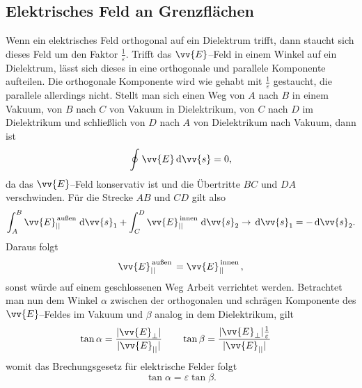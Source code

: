 \subsection{Elektrisches Feld an Grenzflächen}
Wenn ein elektrisches Feld orthogonal auf ein Dielektrum trifft, dann staucht sich dieses Feld um den Faktor $\tfrac{1}{\varepsilon }$. Trifft das $\vv{E}$--Feld in einem Winkel auf ein Dielektrum, lässt sich dieses in eine orthogonale und parallele Komponente aufteilen. Die orthogonale Komponente wird wie gehabt mit $\tfrac{1}{\varepsilon }$ gestaucht, die parallele allerdings nicht. Stellt man sich einen Weg von $A$ nach $B$ in einem Vakuum, von $B$ nach $C$ von Vakuum in Dielektrikum, von $C$ nach $D$ im Dielektrikum und schließlich von $D$ nach $A$ von Dielektrikum nach Vakuum, dann ist
\[ 
        \oint_{}^{}\vv{E}\td \vv{s}=0
,\] 
da das $\vv{E}$--Feld konservativ ist und die Übertritte $BC$ und $DA$ verschwinden. Für die Strecke $AB$ und $CD$ gilt also
\begin{align*}
        \int_{A}^{B}\vv{E}_{| |}^{\,\text{außen}\,}\td \vv{s}_1+\int_{C}^{D}\vv{E}_{| |}^{\,\text{innen}\,}\td \vv{s}_2\rightarrow \td \vv{s}_1=-\td \vv{s}_2
.\end{align*}
Daraus folgt
\[ 
        \vv{E}_{| |}^{\,\text{außen}\,}=\vv{E}_{| |}^{\,\text{innen}\,}
,\] 
sonst würde auf einem geschlossenen Weg Arbeit verrichtet werden. Betrachtet man nun dem Winkel $\alpha $ zwischen der orthogonalen und schrägen Komponente des $\vv{E}$--Feldes im Vakuum und $\beta $ analog in dem Dielektrikum, gilt
\begin{align*}
        \tan \alpha &=\dfrac{|\vv{E}_{\perp}|}{|\vv{E}_{| |}|}\qquad \tan \beta =\dfrac{|\vv{E}_{\perp}|\tfrac{1}{\varepsilon }}{|\vv{E}_{| |}|}
\end{align*}
womit das Brechungsgesetz für elektrische Felder folgt
\[ 
        \tan \alpha =\varepsilon \tan \beta 
.\] 
\fi

